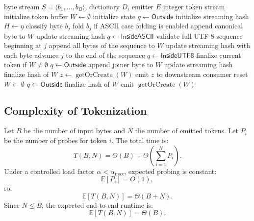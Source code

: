 \documentclass[11pt,a4paper]{article}
\begin{document}
\begin{algorithm}[H]
\caption{FARO Tokenize Stream}
\label{alg:tokenize-stream}
\begin{algorithmic}[1]
\REQUIRE byte stream \(S=\langle b_1,\dots,b_B\rangle\), dictionary \(D\), emitter \(E\)
\ENSURE integer token stream
\STATE initialize token buffer \(W\leftarrow\emptyset\)
\STATE initialize state \(q\leftarrow\textsf{Outside}\)
\STATE initialize streaming hash \(H\leftarrow\eta\)
    \STATE classify byte \(b_j\)
        \STATE fold \(b_j\) if ASCII case folding is enabled
        \STATE append canonical byte to \(W\)
        \STATE update streaming hash
        \STATE \(q\leftarrow\textsf{InsideASCII}\)
        \STATE validate full UTF-8 sequence beginning at \(j\)
            \STATE append all bytes of the sequence to \(W\)
            \STATE update streaming hash with each byte
            \STATE advance \(j\) to the end of the sequence
            \STATE \(q\leftarrow\textsf{InsideUTF8}\)
        \ELSE
            \STATE finalize current token if \(W\ne\emptyset\)
            \STATE \(q\leftarrow\textsf{Outside}\)
        \ENDIF
        \STATE append joiner byte to \(W\)
        \STATE update streaming hash
    \ELSE
            \STATE finalize hash of \(W\)
            \STATE \(z\leftarrow \operatorname{getOrCreate}(W)\)
            \STATE emit \(z\) to downstream consumer
            \STATE reset \(W\leftarrow\emptyset\)
        \ENDIF
        \STATE \(q\leftarrow\textsf{Outside}\)
    \ENDIF
\ENDFOR
{}
    \STATE finalize hash of \(W\)
    \STATE emit \(\operatorname{getOrCreate}(W)\)
\ENDIF
\end{algorithmic}
\end{algorithm}

\subsection{Complexity of Tokenization}

Let \(B\) be the number of input bytes and \(N\) the number of emitted tokens. Let \(P_i\) be the number of probes for token \(i\). The total time is:
\[
T(B,N)=\Theta(B)+\Theta\left(\sum_{i=1}^{N}P_i\right).
\]
Under a controlled load factor \(\alpha<\alpha_{\max}\), expected probing is constant:
\[
\mathbb{E}[P_i]=O(1),
\]
so:
\[
\mathbb{E}[T(B,N)]=\Theta(B+N).
\]
Since \(N\le B\), the expected end-to-end runtime is:
\[
\mathbb{E}[T(B,N)]=\Theta(B).
\]
\end{document}
